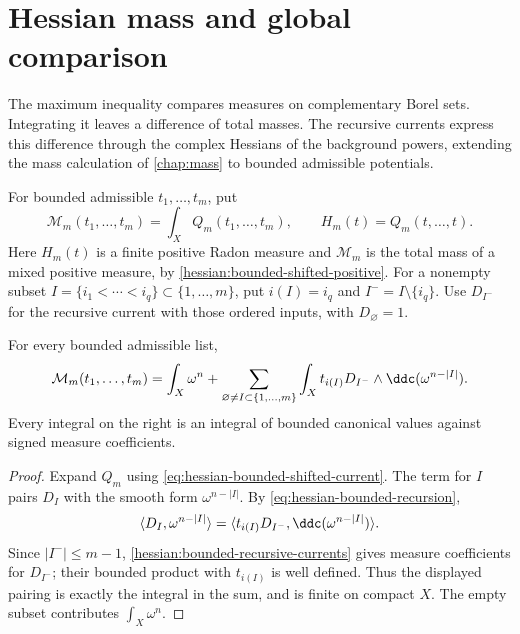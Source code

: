 \section{Hessian mass and global comparison}
\label{draft627:mass-comparison}

The maximum inequality compares measures on complementary Borel sets.
Integrating it leaves a difference of total masses. The recursive
currents express this difference through the complex Hessians of the
background powers, extending the mass calculation of
\cref{chap:mass} to bounded admissible potentials.

For bounded admissible $t_1,\ldots,t_m$, put
\[
 \mathcal M_m(t_1,\ldots,t_m)=\int_XQ_m(t_1,\ldots,t_m),
 \qquad H_m(t)=Q_m(t,\ldots,t).
\]
Here $H_m(t)$ is a finite positive Radon measure and
$\mathcal M_m$ is the total mass of a mixed positive measure, by
\cref{hessian:bounded-shifted-positive}. For a nonempty subset
$I=\{i_1<\cdots<i_q\}\subset\{1,\ldots,m\}$, put
$i(I)=i_q$ and $I^-=I\setminus\{i_q\}$. Use $D_{I^-}$ for the
recursive current with those ordered inputs, with $D_\varnothing=1$.

\begin{lemma}\label{draft627:bounded-mass-expansion}
For every bounded admissible list,
\begin{equation}\label{draft627:eq-bounded-mass-expansion}
 \mathcal M_m(t_1,\ldots,t_m)
 =\int_X\omega^n+
 \sum_{\varnothing\ne I\subset\{1,\ldots,m\}}
 \int_X t_{i(I)}D_{I^-}\wedge\ddc(\omega^{n-|I|}).
\end{equation}
Every integral on the right is an integral of bounded canonical
values against signed measure coefficients.
\end{lemma}
\begin{proof}
Expand $Q_m$ using \eqref{eq:hessian-bounded-shifted-current}.
The term for $I$ pairs $D_I$ with the smooth form
$\omega^{n-|I|}$. By \eqref{eq:hessian-bounded-recursion},
\[
 \langle D_I,\omega^{n-|I|}\rangle
 =\langle t_{i(I)}D_{I^-},\ddc(\omega^{n-|I|})\rangle.
\]
Since $|I^-|\leq m-1$, \cref{hessian:bounded-recursive-currents}
gives measure coefficients for $D_{I^-}$; their bounded product
with $t_{i(I)}$ is well defined. Thus the displayed pairing is
exactly the integral in the sum, and is finite on compact $X$.
The empty subset contributes $\int_X\omega^n$.
\end{proof}

